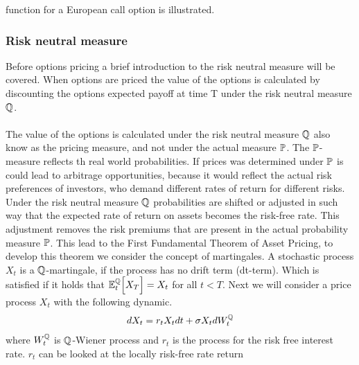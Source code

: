 function for a European call option is illustrated.
\begin{center}
\end{center}
\subsubsection{Risk neutral measure}
Before options pricing a brief introduction to the risk neutral measure will be covered.
When options are priced the value of the options is calculated by discounting 
the options expected payoff at time T under the risk neutral measure $\mathbb{Q}$. 
\\\\
The value of the options is calculated under the risk neutral measure $\mathbb{Q}$ also know as the pricing measure, and 
not under the actual measure $\mathbb{P}$. The $\mathbb{P}$- measure reflects th real world probabilities. If prices was determined 
under $\mathbb{P}$ is could lead to arbitrage opportunities, because it would reflect the actual risk preferences of
investors, who demand different rates of return for different risks. Under the risk neutral measure $\mathbb{Q}$  
probabilities are shifted or adjusted in such way that the expected rate of return on assets becomes the risk-free rate. 
This adjustment removes the risk premiums that are present in the actual probability measure $\mathbb{P}$.
This lead to the First Fundamental Theorem of Asset Pricing, to develop this theorem we consider 
the concept of martingales. 
A stochastic process $X_t$ is a $\mathbb{Q}$-martingale, if the process has no drift term (dt-term). Which is satisfied if it holds that
$\mathbb{E}_{t}^{\mathbb{Q}}\Big[X_T\Big] = X_t$ for all $t<T$. Next we will consider a price process $X_t$ with the following dynamic.
\begin{align}
    d X_t = r_t X_t dt + \sigma X_t d W_{t}^{\mathbb{Q}}
    \label{price_process}
\end{align}
where $W_{t}^{\mathbb{Q}}$ is $\mathbb{Q}$-Wiener process and  $r_t$ is the process for the risk free interest rate. $r_t$ can be looked at the locally risk-free rate return 
